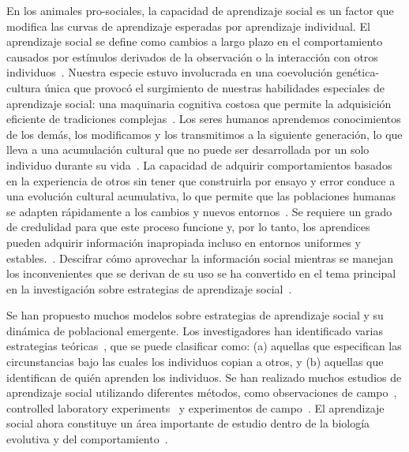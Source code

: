 \documentclass[a4paper,11pt]{book}
\theoremstyle{definition}
\begin{document}
En los animales pro-sociales, la capacidad de aprendizaje social es un factor que modifica las curvas de aprendizaje esperadas por aprendizaje individual.
%
El aprendizaje social se define como cambios a largo plazo en el comportamiento causados por estímulos derivados de la observación o la interacción con otros individuos~\cite{hoppitt2013-socialLearningAnIntroductionBook,bandura1977-socialLearning}.
%
Nuestra especie estuvo involucrada en una coevolución genética-cultura única que provocó el surgimiento de nuestras habilidades especiales de aprendizaje social: una maquinaria cognitiva costosa que permite la adquisición eficiente de tradiciones complejas~\cite{Richerson2010}.
%
Los seres humanos aprendemos conocimientos de los demás, los modificamos y los transmitimos a la siguiente generación, lo que lleva a una acumulación cultural que no puede ser desarrollada por un solo individuo durante su vida~\cite{boyd1985-evolutionaryProcess}.
%
La capacidad de adquirir comportamientos basados en la experiencia de otros sin tener que construirla por ensayo y error conduce a una evolución cultural acumulativa, lo que permite que las poblaciones humanas se adapten rápidamente a los cambios y nuevos entornos~\cite{Boyd2011}.
%
Se requiere un grado de credulidad para que este proceso funcione y, por lo tanto, los aprendices pueden adquirir información inapropiada incluso en entornos uniformes y estables.~\cite{feldman1996-individualVsSocialLearningEvolutionaryAnalysis,giraldeau2002-potentialDisadvantagesSocialLearning}.
%
Descifrar cómo aprovechar la información social mientras se manejan los inconvenientes que se derivan de su uso se ha convertido en el tema principal en la investigación sobre estrategias de aprendizaje social~\cite{henrich2003-evolutionOfCulturalEvolution,rendell2011-cognitiveCulture}.


Se han propuesto muchos modelos sobre estrategias de aprendizaje social y su dinámica de poblacional emergente.
%
Los investigadores han identificado varias estrategias teóricas~\cite{rendell2011-cognitiveCulture,rendell2010-socialLearningTournament}, que se puede clasificar como:
(a) aquellas que especifican las circunstancias bajo las cuales los individuos copian a otros, y
(b) aquellas que identifican de quién aprenden los individuos.
%
Se han realizado muchos estudios de aprendizaje social utilizando diferentes métodos, como observaciones de campo~\cite{henrich2011-adaptativeLearningBiasesFiji}, controlled laboratory experiments~\cite{mesoudi2011-experimentalPayoffBiasedSocialLearningUnderused,toelch2014-humanSocialInformationUse,caldwell2016-innovationLaboratoryCulturalEvolution,muthukrishna2016-whenAndWhoSocialLearning} y experimentos de campo~\cite{henrich2001-eco15Soc,efferson2007-learningCulturalTransmissionBolivia,wisdom2013-experiment,Glowacki2017}.
%
El aprendizaje social ahora constituye un área importante de estudio dentro de la biología evolutiva y del comportamiento~\cite{mesoudi2016-individualAndCulturalVariationSocialLearning}.
\end{document}
